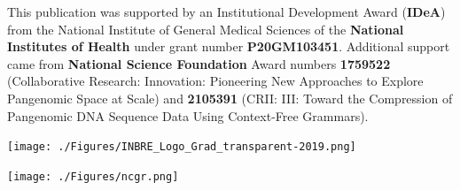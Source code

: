\documentclass[
]{book}
\begin{document}
This publication was supported by an Institutional Development Award (\textbf{IDeA}) from the National Institute of General Medical Sciences of the \textbf{National Institutes of Health} under grant number \textbf{P20GM103451}. Additional support came from \textbf{National Science Foundation} Award numbers \textbf{1759522} (Collaborative Research: Innovation: Pioneering New Approaches to Explore Pangenomic Space at Scale) and \textbf{2105391} (CRII: III: Toward the Compression of Pangenomic DNA Sequence Data Using Context-Free Grammars).

\texttt{[image: ./Figures/INBRE\_Logo\_Grad\_transparent-2019.png]}

\texttt{[image: ./Figures/ncgr.png]}

  
\end{document}
